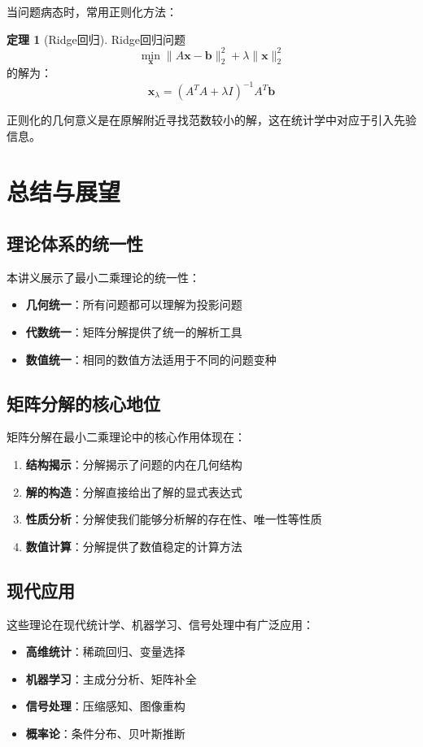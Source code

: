 \documentclass[11pt,a4paper]{ctexart}
\theoremstyle{definition}
\newtheorem{theorem}{定理}[section]
\begin{document}
当问题病态时，常用正则化方法：

\begin{theorem}[Ridge回归]
Ridge回归问题
$$\min_{\boldsymbol{x}} \|A\boldsymbol{x} - \boldsymbol{b}\|_2^2 + \lambda\|\boldsymbol{x}\|_2^2$$
的解为：
$$\boldsymbol{x}_\lambda = (A^TA + \lambda I)^{-1}A^T\boldsymbol{b}$$
\end{theorem}

正则化的几何意义是在原解附近寻找范数较小的解，这在统计学中对应于引入先验信息。

\section{总结与展望}

\subsection{理论体系的统一性}

本讲义展示了最小二乘理论的统一性：
\begin{itemize}
\item \textbf{几何统一}：所有问题都可以理解为投影问题
\item \textbf{代数统一}：矩阵分解提供了统一的解析工具
\item \textbf{数值统一}：相同的数值方法适用于不同的问题变种
\end{itemize}

\subsection{矩阵分解的核心地位}

矩阵分解在最小二乘理论中的核心作用体现在：
\begin{enumerate}
\item \textbf{结构揭示}：分解揭示了问题的内在几何结构
\item \textbf{解的构造}：分解直接给出了解的显式表达式
\item \textbf{性质分析}：分解使我们能够分析解的存在性、唯一性等性质
\item \textbf{数值计算}：分解提供了数值稳定的计算方法
\end{enumerate}

\subsection{现代应用}

这些理论在现代统计学、机器学习、信号处理中有广泛应用：
\begin{itemize}
\item \textbf{高维统计}：稀疏回归、变量选择
\item \textbf{机器学习}：主成分分析、矩阵补全
\item \textbf{信号处理}：压缩感知、图像重构
\item \textbf{概率论}：条件分布、贝叶斯推断
\end{itemize}
\end{document}
